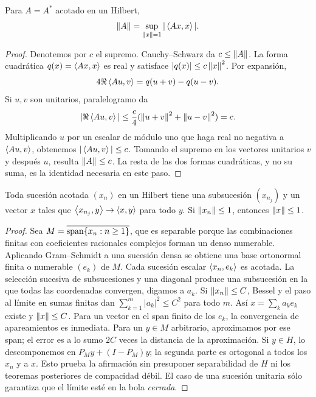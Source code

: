 \begin{lema}\label{v3:norma-cuadratica}
Para $A=A^*$ acotado en un Hilbert,
\[\left\lVert A\right\rVert=\sup_{\left\lVert x\right\rVert=1}|\left\langle Ax,x\right\rangle|.
\]
\end{lema}
\begin{proof}
Denotemos por $c$ el supremo. Cauchy--Schwarz da $c\le\left\lVert A\right\rVert$. La forma cuadrática $q(x)=\left\langle Ax,x\right\rangle$ es real y satisface $|q(x)|\le c\left\lVert x\right\rVert^2$. Por expansión,
\[4\Re\left\langle Au,v\right\rangle=q(u+v)-q(u-v).
\]
Si $u,v$ son unitarios, paralelogramo da
\[|\Re\left\langle Au,v\right\rangle|\le\frac c4(\left\lVert u+v\right\rVert^2+\left\lVert u-v\right\rVert^2)=c.
\]
Multiplicando $u$ por un escalar de módulo uno que haga real no negativa a $\left\langle Au,v\right\rangle$, obtenemos $|\left\langle Au,v\right\rangle|\le c$. Tomando el supremo en los vectores unitarios $v$ y después $u$, resulta $\left\lVert A\right\rVert\le c$. La resta de las dos formas cuadráticas, y no su suma, es la identidad necesaria en este paso.
\end{proof}

\begin{proposicion}\label{v3:hilbert-subsucesion}
Toda sucesión acotada $(x_n)$ en un Hilbert tiene una subsucesión $(x_{n_j})$ y un vector $x$ tales que $\left\langle x_{n_j},y\right\rangle\to\left\langle x,y\right\rangle$ para todo $y$. Si $\left\lVert x_n\right\rVert\le1$, entonces $\left\lVert x\right\rVert\le1$.
\end{proposicion}
\begin{proof}
Sea $M=\overline{\operatorname{span}\{x_n:n\ge1\}}$, que es separable porque las combinaciones finitas con coeficientes racionales complejos forman un denso numerable. Aplicando Gram--Schmidt a una sucesión densa se obtiene una base ortonormal finita o numerable $(e_k)$ de $M$. Cada sucesión escalar $\left\langle x_n,e_k\right\rangle$ es acotada. La selección sucesiva de subsucesiones y una diagonal produce una subsucesión en la que todas las coordenadas convergen, digamos a $a_k$. Si $\left\lVert x_n\right\rVert\le C$, Bessel y el paso al límite en sumas finitas dan $\sum_{k=1}^m|a_k|^2\le C^2$ para todo $m$. Así $x=\sum_ka_ke_k$ existe y $\left\lVert x\right\rVert\le C$. Para un vector en el span finito de los $e_k$, la convergencia de apareamientos es inmediata. Para un $y\in M$ arbitrario, aproximamos por ese span; el error es a lo sumo $2C$ veces la distancia de la aproximación. Si $y\in H$, lo descomponemos en $P_My+(I-P_M)y$; la segunda parte es ortogonal a todos los $x_n$ y a $x$. Esto prueba la afirmación sin presuponer separabilidad de $H$ ni los teoremas posteriores de compacidad débil. El caso de una sucesión unitaria sólo garantiza que el límite esté en la bola \emph{cerrada}.
\end{proof}

